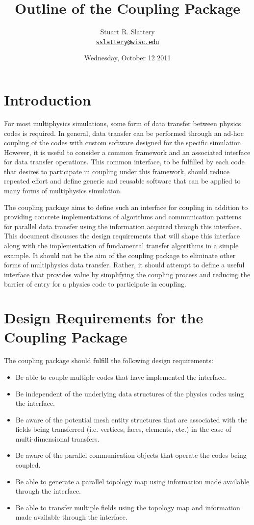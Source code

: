 \documentclass[letterpaper]{article}
\author{Stuart R. Slattery
\\ \href{mailto:sslattery@wisc.edu}{\texttt{sslattery@wisc.edu}}
}
\date{Wednesday, October 12 2011}
\title{Outline of the Coupling Package}
\begin{document}
\maketitle

\section{Introduction}
For most multiphysics simulations, some form of data transfer between
physics codes is required. In general, data transfer can be performed
through an ad-hoc coupling of the codes with custom software designed
for the specific simulation. However, it is useful to consider a
common framework and an associated interface for data transfer
operations. This common interface, to be fulfilled by each code that
desires to participate in coupling under this framework, should reduce
repeated effort and define generic and reusable software that can be
applied to many forms of multiphysics simulation.

The coupling package aims to define such an interface for coupling in
addition to providing concrete implementations of algorithms and
communication patterns for parallel data transfer using the
information acquired through this interface. This document discusses
the design requirements that will shape this interface along with the
implementation of fundamental transfer algorithms in a simple example.
It should not be the aim of the coupling package to eliminate other
forms of multiphysics data transfer. Rather, it should attempt to
define a useful interface that provides value by simplifying the
coupling process and reducing the barrier of entry for a physics code
to participate in coupling. 

\section{Design Requirements for the Coupling Package}
The coupling package should fulfill the following design
requirements:

\begin{itemize}
\item Be able to couple multiple codes that have implemented the
  interface.
\item Be independent of the underlying data structures of the physics
  codes using the interface.
\item Be aware of the potential mesh entity structures that are
  associated with the fields being transferred (i.e. vertices, faces,
  elements, etc.) in the case of multi-dimensional transfers.
\item Be aware of the parallel communication objects that operate the
  codes being coupled.
\item Be able to generate a parallel topology map using information
  made available through the interface.
\item Be able to transfer multiple fields using the topology map and
  information made available through the interface.
\end{itemize}
\end{document}
